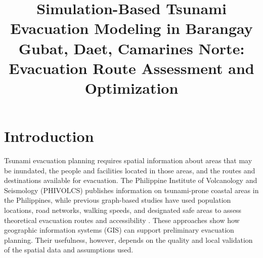 \documentclass[conference]{IEEEtran}
\begin{document}
\title{Simulation-Based Tsunami Evacuation Modeling in Barangay Gubat, Daet, Camarines Norte: Evacuation Route Assessment and Optimization}
\author{}
\maketitle
\section{Introduction}

Tsunami evacuation planning requires spatial information about areas that may be inundated, the people and facilities located in those areas, and the routes and destinations available for evacuation. The Philippine Institute of Volcanology and Seismology (PHIVOLCS) publishes information on tsunami-prone coastal areas in the Philippines, while previous graph-based studies have used population locations, road networks, walking speeds, and designated safe areas to assess theoretical evacuation routes and accessibility \cite{phivolcs,peroche}. These approaches show how geographic information systems (GIS) can support preliminary evacuation planning. Their usefulness, however, depends on the quality and local validation of the spatial data and assumptions used.
\end{document}
